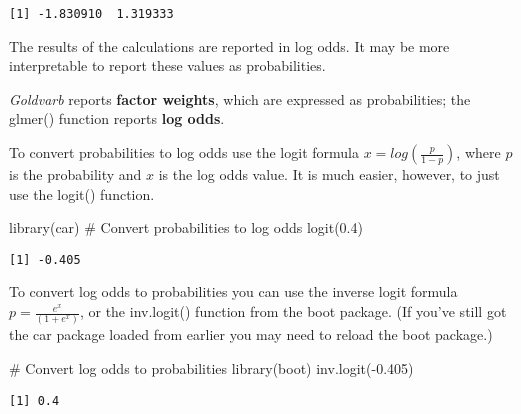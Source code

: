 \documentclass[
  10pt,
  letterpaper]{article}
\newenvironment{Shaded}{\begin{snugshade}}{\end{snugshade}}
\newcommand{\CommentTok}[1]{\textcolor[rgb]{0.37,0.37,0.37}{#1}}
\newcommand{\FloatTok}[1]{\textcolor[rgb]{0.68,0.00,0.00}{#1}}
\newcommand{\FunctionTok}[1]{\textcolor[rgb]{0.28,0.35,0.67}{#1}}
\newcommand{\NormalTok}[1]{\textcolor[rgb]{0.00,0.23,0.31}{#1}}
\newcommand{\SpecialCharTok}[1]{\textcolor[rgb]{0.37,0.37,0.37}{#1}}
\renewcommand\texttt[1]{{\ttfamily\color{BrickRed}#1}}
\begin{document}
\begin{verbatim}
[1] -1.830910  1.319333
\end{verbatim}

The results of the calculations are reported in log odds. It may be more
interpretable to report these values as probabilities.

\begin{tcolorbox}[enhanced jigsaw, colbacktitle=quarto-callout-note-color!10!white, left=2mm, breakable, opacityback=0, toprule=.15mm, titlerule=0mm, bottomtitle=1mm, colframe=quarto-callout-note-color-frame, opacitybacktitle=0.6, coltitle=black, leftrule=.75mm, toptitle=1mm, rightrule=.15mm, title=\textcolor{quarto-callout-note-color}{\faInfo}\hspace{0.5em}{Converting betweeen Log Odds and Probabilities (Factor Weights)}, bottomrule=.15mm, colback=white, arc=.35mm]

\emph{Goldvarb} reports \textbf{factor weights}, which are expressed as
probabilities; the \texttt{glmer()} function reports \textbf{log odds}.

To convert probabilities to log odds use the logit formula
\(x=log(\frac{p}{1-p})\), where \(p\) is the probability and \(x\) is
the log odds value. It is much easier, however, to just use the
\texttt{logit()} function.

\begin{Shaded}
\begin{Highlighting}[]
\FunctionTok{library}\NormalTok{(car)}
\CommentTok{\# Convert probabilities to log odds}
\FunctionTok{logit}\NormalTok{(}\FloatTok{0.4}\NormalTok{)}
\end{Highlighting}
\end{Shaded}

\begin{verbatim}
[1] -0.405
\end{verbatim}

To convert log odds to probabilities you can use the inverse logit
formula \(p=\frac{e^x}{(1+e^x)}\), or the \texttt{inv.logit()} function
from the \texttt{boot} package. (If you've still got the \texttt{car}
package loaded from earlier you may need to reload the \texttt{boot}
package.)

\begin{Shaded}
\begin{Highlighting}[]
\CommentTok{\# Convert log odds to probabilities}
\FunctionTok{library}\NormalTok{(boot)}
\FunctionTok{inv.logit}\NormalTok{(}\SpecialCharTok{{-}}\FloatTok{0.405}\NormalTok{)}
\end{Highlighting}
\end{Shaded}

\begin{verbatim}
[1] 0.4
\end{verbatim}

\end{tcolorbox}
\end{document}
